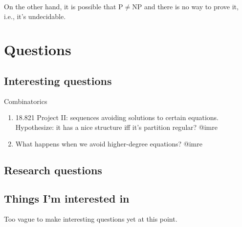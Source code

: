 On the other hand, it is possible that P$\ne$NP and there is no way to prove it, i.e., it's undecidable. 













\chapter{Questions}

%

\section{Interesting questions}

Combinatorics
\begin{enumerate}
\item
18.821 Project II: sequences avoiding solutions to certain equations. Hypothesize: it has a nice structure iff it's partition regular? @imre
\item 
What happens when we avoid higher-degree equations? @imre
\end{enumerate}

\section{Research questions}

\section{Things I'm interested in}
Too vague to make interesting questions yet at this point.


